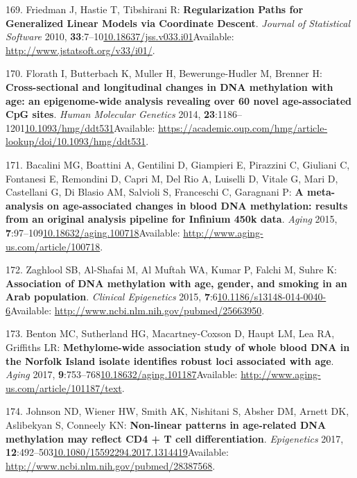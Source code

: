 \documentclass[
]{book}
\begin{document}
\leavevmode\hypertarget{ref-Friedman2010}{}%
169. Friedman J, Hastie T, Tibshirani R: \textbf{Regularization Paths for Generalized Linear Models via Coordinate Descent}. \emph{Journal of Statistical Software} 2010, \textbf{33}:7--10\href{https://doi.org/10.18637/jss.v033.i01}{10.18637/jss.v033.i01}Available: \url{http://www.jstatsoft.org/v33/i01/}.

\leavevmode\hypertarget{ref-Florath2014}{}%
170. Florath I, Butterbach K, Muller H, Bewerunge-Hudler M, Brenner H: \textbf{Cross-sectional and longitudinal changes in DNA methylation with age: an epigenome-wide analysis revealing over 60 novel age-associated CpG sites}. \emph{Human Molecular Genetics} 2014, \textbf{23}:1186--1201\href{https://doi.org/10.1093/hmg/ddt531}{10.1093/hmg/ddt531}Available: \url{https://academic.oup.com/hmg/article-lookup/doi/10.1093/hmg/ddt531}.

\leavevmode\hypertarget{ref-Bacalini2015}{}%
171. Bacalini MG, Boattini A, Gentilini D, Giampieri E, Pirazzini C, Giuliani C, Fontanesi E, Remondini D, Capri M, Del Rio A, Luiselli D, Vitale G, Mari D, Castellani G, Di Blasio AM, Salvioli S, Franceschi C, Garagnani P: \textbf{A meta-analysis on age-associated changes in blood DNA methylation: results from an original analysis pipeline for Infinium 450k data}. \emph{Aging} 2015, \textbf{7}:97--109\href{https://doi.org/10.18632/aging.100718}{10.18632/aging.100718}Available: \url{http://www.aging-us.com/article/100718}.

\leavevmode\hypertarget{ref-Zaghlool2015}{}%
172. Zaghlool SB, Al-Shafai M, Al Muftah WA, Kumar P, Falchi M, Suhre K: \textbf{Association of DNA methylation with age, gender, and smoking in an Arab population}. \emph{Clinical Epigenetics} 2015, \textbf{7}:6\href{https://doi.org/10.1186/s13148-014-0040-6}{10.1186/s13148-014-0040-6}Available: \url{http://www.ncbi.nlm.nih.gov/pubmed/25663950}.

\leavevmode\hypertarget{ref-Benton2017}{}%
173. Benton MC, Sutherland HG, Macartney-Coxson D, Haupt LM, Lea RA, Griffiths LR: \textbf{Methylome-wide association study of whole blood DNA in the Norfolk Island isolate identifies robust loci associated with age}. \emph{Aging} 2017, \textbf{9}:753--768\href{https://doi.org/10.18632/aging.101187}{10.18632/aging.101187}Available: \url{http://www.aging-us.com/article/101187/text}.

\leavevmode\hypertarget{ref-Johnson2017}{}%
174. Johnson ND, Wiener HW, Smith AK, Nishitani S, Absher DM, Arnett DK, Aslibekyan S, Conneely KN: \textbf{Non-linear patterns in age-related DNA methylation may reflect CD4 + T cell differentiation}. \emph{Epigenetics} 2017, \textbf{12}:492--503\href{https://doi.org/10.1080/15592294.2017.1314419}{10.1080/15592294.2017.1314419}Available: \url{http://www.ncbi.nlm.nih.gov/pubmed/28387568}.
\end{document}
